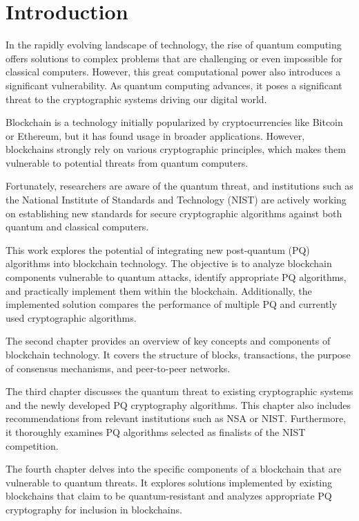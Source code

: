 % 

\chapter{Introduction}

In the rapidly evolving landscape of technology, the rise of quantum computing offers solutions to complex problems that are challenging or even impossible for classical computers. However, this great computational power also introduces a significant vulnerability. As quantum computing advances, it poses a significant threat to the cryptographic systems driving our digital world.

Blockchain is a technology initially popularized by cryptocurrencies like Bitcoin or Ethereum, but it has found usage in broader applications. However, blockchains strongly rely on various cryptographic principles, which makes them vulnerable to potential threats from quantum computers.

Fortunately, researchers are aware of the quantum threat, and institutions such as the National Institute of Standards and Technology (NIST) are actively working on establishing new standards for secure cryptographic algorithms against both quantum and classical computers.

This work explores the potential of integrating new post-quantum (PQ) algorithms into blockchain technology. The objective is to analyze blockchain components vulnerable to quantum attacks, identify appropriate PQ algorithms, and practically implement them within the blockchain. Additionally, the implemented solution compares the performance of multiple PQ and currently used cryptographic algorithms.

The second chapter provides an overview of key concepts and components of blockchain technology. It covers the structure of blocks, transactions, the purpose of consensus mechanisms, and peer-to-peer networks.

The third chapter discusses the quantum threat to existing cryptographic systems and the newly developed PQ cryptography algorithms. This chapter also includes recommendations from relevant institutions such as NSA or NIST. Furthermore, it thoroughly examines PQ algorithms selected as finalists of the NIST competition.

The fourth chapter delves into the specific components of a blockchain that are vulnerable to quantum threats. It explores solutions implemented by existing blockchains that claim to be quantum-resistant and analyzes appropriate PQ cryptography for inclusion in blockchains.

